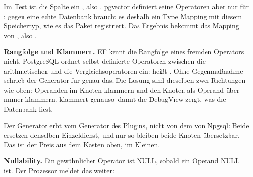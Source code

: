 Im Test ist die Spalte ein , also . pgvector definiert seine
Operatoren aber nur für ; gegen eine echte Datenbank braucht es deshalb ein Type
Mapping mit diesem Speichertyp, wie es das Paket registriert. Das Ergebnis bekommt das Mapping
von , also .

\textbf{Rangfolge und Klammern.} EF kennt die Rangfolge eines fremden Operators nicht.
PostgreSQL ordnet selbst definierte Operatoren zwischen die arithmetischen und die
Vergleichsoperatoren ein:  heißt
. Ohne Gegenmaßnahme schrieb der
Generator für  genau das. Die Lösung sind dieselben zwei Richtungen wie oben: Operanden im Knoten
klammern und den Knoten als Operand über
 immer klammern.  klammert genauso, damit
die DebugView zeigt, was die Datenbank liest.


Der Generator erbt vom Generator des Plugins, nicht von dem von Npgsql: Beide ersetzen
denselben Einzeldienst, und nur so bleiben beide Knoten übersetzbar. Das ist der Preis aus
dem Kasten oben, im Kleinen.

\textbf{Nullability.} Ein gewöhnlicher Operator ist NULL, sobald ein Operand NULL ist. Der
Prozessor meldet das weiter:

